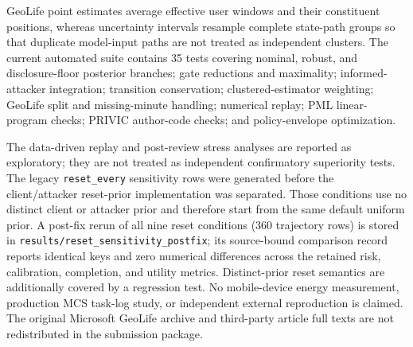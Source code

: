 \documentclass[10pt,journal,compsoc]{IEEEtran}
\begin{document}
GeoLife point estimates average effective user windows and their constituent positions, whereas uncertainty intervals resample complete state-path groups so that duplicate model-input paths are not treated as independent clusters. The current automated suite contains 35 tests covering nominal, robust, and disclosure-floor posterior branches; gate reductions and maximality; informed-attacker integration; transition conservation; clustered-estimator weighting; GeoLife split and missing-minute handling; numerical replay; PML linear-program checks; PRIVIC author-code checks; and policy-envelope optimization.

The data-driven replay and post-review stress analyses are reported as exploratory; they are not treated as independent confirmatory superiority tests. The legacy \texttt{reset\_every} sensitivity rows were generated before the client/attacker reset-prior implementation was separated. Those conditions use no distinct client or attacker prior and therefore start from the same default uniform prior. A post-fix rerun of all nine reset conditions (360 trajectory rows) is stored in \texttt{results/reset\_sensitivity\_postfix}; its source-bound comparison record reports identical keys and zero numerical differences across the retained risk, calibration, completion, and utility metrics. Distinct-prior reset semantics are additionally covered by a regression test. No mobile-device energy measurement, production MCS task-log study, or independent external reproduction is claimed. The original Microsoft GeoLife archive and third-party article full texts are not redistributed in the submission package.



\end{document}
